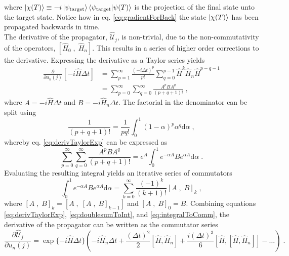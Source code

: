 where $\ket{\chi (T)} \equiv -i \ket{\psi_{\mathrm{target}}} \braket{\psi_{\mathrm{target}} | \psi (T)}$ is the projection of the final state unto the target state. Notice how in eq. \eqref{eq:gradientForBack} the state $\ket{\chi (T)}$ has been propagated backwards in time.\\ 
The derivative of the propagator, $\hat{\mathcal{U}}_{j}$, is non-trivial, due to the non-commutativity of the operators, $[ \hat{H}_0 \; , \; \hat{H}_n ]$. This results in a series of higher order corrections to the derivative.
Expressing the derivative as a Taylor series yields
\begin{align}
	\frac{\partial}{\partial u_n (j)} \left[ -i \hat{H} \Delta t \right] &= \sum_{p=1}^{\infty} \frac{ \left( -i \Delta t \right) ^p }{p!} \sum_{q=0}^{p-1} \hat{H}^k \hat{H}_n \hat{H}^{p-q-1} \nonumber \\
	&= \sum_{p=0}^{\infty} \sum_{q=0}^{\infty} \frac{A^p B A^q}{(p+q+1)!} \; ,
	\label{eq:derivTaylorExp}
\end{align}  
where $A = -i \hat{H} \Delta t$ and $B = -i \hat{H}_n \Delta t$. The factorial in the denominator can be split using
\begin{equation}
	\frac{1}{(p+q+1)!} = \frac{1}{p q !} \int_{0}^{1} (1-\alpha)^p \alpha^q \mathrm{d}\alpha \; ,
\end{equation}
whereby eq. \eqref{eq:derivTaylorExp} can be expressed as
\begin{equation}
	\sum_{p=0}^{\infty} \sum_{q=0}^{\infty} \frac{A^p B A^q}{(p+q+1)!} =  e^{A} \int_{0}^{1} e^{- \alpha A} B e^{ \alpha A} \mathrm{d}\alpha \; .
	\label{eq:doublesumToInt}
\end{equation}
Evaluating the resulting integral yields an iterative series of commutators
\begin{equation}
	\int_{0}^{1} e^{- \alpha A} B e^{ \alpha A} \mathrm{d}\alpha = \sum_{k=0}^{\infty} \frac{ (-1)^k}{(k+1)!} \left[ A \; , \; B \right]_k \; , 
	\label{eq:integralToComm}
\end{equation}
where $\left[ A \; , \; B \right]_k = \left[ A \; , \; \left[ A \; , \; B \right]_{k-1} \right]$ and $\left[ A \; , \; B \right]_0 = B$.
Combining equations \eqref{eq:derivTaylorExp}, \eqref{eq:doublesumToInt}, and \eqref{eq:integralToComm}, the derivative of the propagator can be written as the commutator series 
\begin{equation}
	\frac{\partial \hat{\mathcal{U}}_{j}}{\partial u_n (j)} = \exp \{ -i \hat{H} \Delta t \} \left( -i \hat{H}_n \Delta t + \frac{(\Delta t)^2}{2} \left[ \hat{H} , \hat{H}_n  \right] + \frac{i (\Delta t)^3}{6} \left[ \hat{H} , \left[ \hat{H} , \hat{H}_n  \right]  \right] - \ldots \right) \; .
	\label{eq:higherOrderGradient}
\end{equation}
